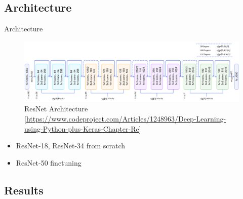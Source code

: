 \documentclass[10pt]{beamer}
\begin{document}
\subsection{Architecture}

\begin{frame}{Architecture}
	\begin{figure}
		\includegraphics[width=\columnwidth]{images/resnet.png}
		\caption{ResNet Architecture\newline{} [\url{https://www.codeproject.com/Articles/1248963/Deep-Learning-using-Python-plus-Keras-Chapter-Re}]}
	\end{figure}

	\begin{itemize}
		\item ResNet-18, ResNet-34 from scratch
		\item ResNet-50 finetuning
	\end{itemize}
\end{frame}

\subsection{Results}
\end{document}
